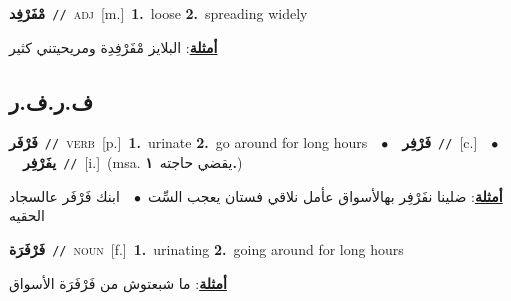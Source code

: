 \documentclass[10pt,a4paper,twoside]{article} %
\begin{document}
\begin{multicols}{2}
{\setlength\topsep{0pt}\textbf{\foreignlanguage{arabic}{مْفَرْفِد}}\ {\color{gray}\texttt{//}\color{black}}\ \textsc{adj}\ [m.]\ \textbf{1.}~loose  \textbf{2.}~spreading widely\  \begin{flushright}\color{gray}\foreignlanguage{arabic}{\textbf{\underline{\foreignlanguage{arabic}{أمثلة}}}: البلايز مْفَرْفِدِة ومريحيتني كثير}\end{flushright}\color{black}} \vspace{2mm}

\vspace{-3mm}
\subsection*{\color{blue}\foreignlanguage{arabic}{ف.ر.ف.ر}\color{blue}{}} 

{\setlength\topsep{0pt}\textbf{\foreignlanguage{arabic}{فَرْفَر}}\ {\color{gray}\texttt{//}\color{black}}\ \textsc{verb}\ [p.]\ \textbf{1.}~urinate  \textbf{2.}~go around for long hours\ \ $\bullet$\ \ \setlength\topsep{0pt}\textbf{\foreignlanguage{arabic}{فَرْفِر}}\ {\color{gray}\texttt{//}\color{black}}\ [c.]\ \ $\bullet$\ \ \setlength\topsep{0pt}\textbf{\foreignlanguage{arabic}{يفَرْفِر}}\ {\color{gray}\texttt{//}\color{black}}\ [i.]\ \color{gray}(msa. \foreignlanguage{arabic}{يقضي حاجته}~\foreignlanguage{arabic}{\textbf{١.}})\color{black}\  \begin{flushright}\color{gray}\foreignlanguage{arabic}{\textbf{\underline{\foreignlanguage{arabic}{أمثلة}}}: ضلينا نفَرْفِر بهالأسواق عأمل نلاقي فستان يعجب السِّت\ $\bullet$\ \  ابنك فَرْفَر عالسجاد الحقيه}\end{flushright}\color{black}} \vspace{2mm}

{\setlength\topsep{0pt}\textbf{\foreignlanguage{arabic}{فَرْفَرَة}}\ {\color{gray}\texttt{//}\color{black}}\ \textsc{noun}\ [f.]\ \textbf{1.}~urinating  \textbf{2.}~going around for long hours\  \begin{flushright}\color{gray}\foreignlanguage{arabic}{\textbf{\underline{\foreignlanguage{arabic}{أمثلة}}}: ما شبعتوش من فَرْفَرَة الأسواق}\end{flushright}\color{black}} \vspace{2mm}


\end{multicols}
\end{document}
